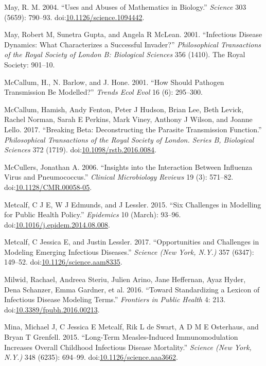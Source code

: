 \documentclass[]{book}
\theoremstyle{definition}
\theoremstyle{definition}
\theoremstyle{definition}
\theoremstyle{remark}
\begin{document}
\hypertarget{ref-may04}{}
May, R. M. 2004. ``Uses and Abuses of Mathematics in Biology.''
\emph{Science} 303 (5659): 790--93.
doi:\href{https://doi.org/10.1126/science.1094442}{10.1126/science.1094442}.

\hypertarget{ref-may01}{}
May, Robert M, Sunetra Gupta, and Angela R McLean. 2001. ``Infectious
Disease Dynamics: What Characterizes a Successful Invader?''
\emph{Philosophical Transactions of the Royal Society of London B:
Biological Sciences} 356 (1410). The Royal Society: 901--10.

\hypertarget{ref-mccallum01}{}
McCallum, H., N. Barlow, and J. Hone. 2001. ``How Should Pathogen
Transmission Be Modelled?'' \emph{Trends Ecol Evol} 16 (6): 295--300.

\hypertarget{ref-mccallum17}{}
McCallum, Hamish, Andy Fenton, Peter J Hudson, Brian Lee, Beth Levick,
Rachel Norman, Sarah E Perkins, Mark Viney, Anthony J Wilson, and Joanne
Lello. 2017. ``Breaking Beta: Deconstructing the Parasite Transmission
Function.'' \emph{Philosophical Transactions of the Royal Society of
London. Series B, Biological Sciences} 372 (1719).
doi:\href{https://doi.org/10.1098/rstb.2016.0084}{10.1098/rstb.2016.0084}.

\hypertarget{ref-mccullers06}{}
McCullers, Jonathan A. 2006. ``Insights into the Interaction Between
Influenza Virus and Pneumococcus.'' \emph{Clinical Microbiology Reviews}
19 (3): 571--82.
doi:\href{https://doi.org/10.1128/CMR.00058-05}{10.1128/CMR.00058-05}.

\hypertarget{ref-metcalf15}{}
Metcalf, C J E, W J Edmunds, and J Lessler. 2015. ``Six Challenges in
Modelling for Public Health Policy.'' \emph{Epidemics} 10 (March):
93--96.
doi:\href{https://doi.org/10.1016/j.epidem.2014.08.008}{10.1016/j.epidem.2014.08.008}.

\hypertarget{ref-metcalf17}{}
Metcalf, C Jessica E, and Justin Lessler. 2017. ``Opportunities and
Challenges in Modeling Emerging Infectious Diseases.'' \emph{Science
(New York, N.Y.)} 357 (6347): 149--52.
doi:\href{https://doi.org/10.1126/science.aam8335}{10.1126/science.aam8335}.

\hypertarget{ref-milwid16}{}
Milwid, Rachael, Andreea Steriu, Julien Arino, Jane Heffernan, Ayaz
Hyder, Dena Schanzer, Emma Gardner, et al. 2016. ``Toward Standardizing
a Lexicon of Infectious Disease Modeling Terms.'' \emph{Frontiers in
Public Health} 4: 213.
doi:\href{https://doi.org/10.3389/fpubh.2016.00213}{10.3389/fpubh.2016.00213}.

\hypertarget{ref-mina15}{}
Mina, Michael J, C Jessica E Metcalf, Rik L de Swart, A D M E Osterhaus,
and Bryan T Grenfell. 2015. ``Long-Term Measles-Induced Immunomodulation
Increases Overall Childhood Infectious Disease Mortality.''
\emph{Science (New York, N.Y.)} 348 (6235): 694--99.
doi:\href{https://doi.org/10.1126/science.aaa3662}{10.1126/science.aaa3662}.
\end{document}
